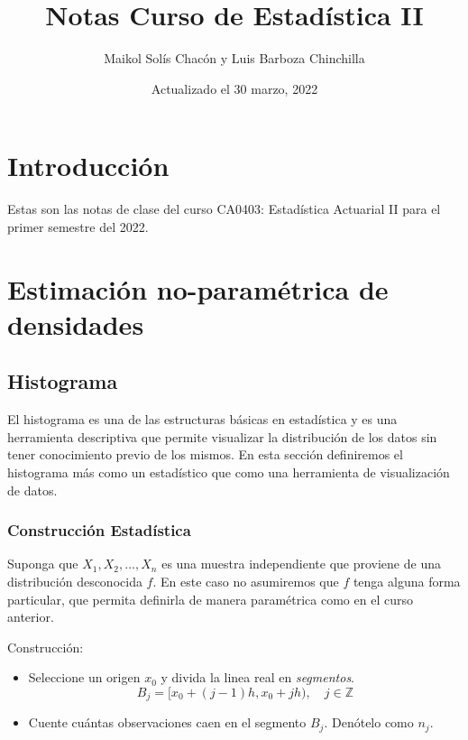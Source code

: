 \documentclass[
  12pt,
]{book}
\title{Notas Curso de Estadística II}
\author{Maikol Solís Chacón y Luis Barboza Chinchilla}
\date{Actualizado el 30 marzo, 2022}
\theoremstyle{definition}
\theoremstyle{definition}
\theoremstyle{definition}
\theoremstyle{definition}
\theoremstyle{remark}
\begin{document}
\maketitle

{
\hypersetup{linkcolor=}
\setcounter{tocdepth}{4}
\tableofcontents
}
\hypertarget{introducciuxf3n}{%
\chapter{Introducción}\label{introducciuxf3n}}

Estas son las notas de clase del curso CA0403: Estadística Actuarial II para el primer semestre del 2022.

\hypertarget{estimaciuxf3n-no-paramuxe9trica-de-densidades}{%
\chapter{Estimación no-paramétrica de densidades}\label{estimaciuxf3n-no-paramuxe9trica-de-densidades}}

\hypertarget{histograma}{%
\section{Histograma}\label{histograma}}

El histograma es una de las estructuras básicas en estadística y es una herramienta descriptiva que permite visualizar la distribución de los datos sin tener conocimiento previo de los mismos. En esta sección definiremos el histograma más como un estadístico que como una herramienta de visualización de datos.

\hypertarget{construcciuxf3n-estaduxedstica}{%
\subsection{Construcción Estadística}\label{construcciuxf3n-estaduxedstica}}

Suponga que \(X_1,X_2, \dots ,X_n\) es una muestra independiente que proviene de una distribución desconocida \(f\). En este caso no asumiremos que \(f\) tenga alguna forma particular, que permita definirla de manera paramétrica como en el curso anterior.

Construcción:

\begin{itemize}
\item
  Seleccione un origen \(x_0\) y divida la linea real en \emph{segmentos}.
  \begin{equation*}
  B_j = [x_0 +(j - 1)h,x_0 + jh), \quad j\in \mathbb{Z}
  \end{equation*}
\item
  Cuente cuántas observaciones caen en el segmento \(B_j\). Denótelo como \(n_j\).
\end{itemize}
\end{document}
